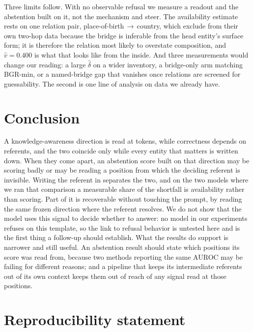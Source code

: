 \documentclass{article}
\begin{document}
Three limits follow. With no observable refusal we measure a readout and the abstention built on it,
not the mechanism \citet{ferrando2025entity} and \citet{lindsey2025biology} steer. The availability
estimate rests on one relation pair, place-of-birth\,$\to$\,country, which \citet{yang2024shortcuts}
exclude from their own two-hop data because the bridge is inferable from the head entity's surface
form; it is therefore the relation most likely to overstate composition, and $\hat v=0.400$ is what
that looks like from the inside. And three measurements would change our reading: a large
$\hat\delta$ on a wider inventory, a bridge-only arm matching BGR-min, or a named-bridge gap that
vanishes once relations are screened for guessability. The second is one line of analysis on data we
already have.

\section{Conclusion}

A knowledge-awareness direction is read at tokens, while correctness depends on referents, and the two
coincide only while every entity that matters is written down. When they come apart, an abstention
score built on that direction may be scoring badly or may be reading a position from which the
deciding referent is invisible. Writing the referent in separates the two, and on the two models where
we ran that comparison a measurable share of the shortfall is availability rather than scoring. Part
of it is recoverable without touching the prompt, by reading the same frozen direction where the
referent resolves. We do not show that the model uses this signal to decide whether to answer: no
model in our experiments refuses on this template, so the link to refusal behavior is untested here
and is the first thing a follow-up should establish. What the results do support is narrower and still
useful. An abstention result should state which positions its score was read from, because two methods
reporting the same AUROC may be failing for different reasons; and a pipeline that keeps its
intermediate referents out of its own context keeps them out of reach of any signal read at those
positions.

\section*{Reproducibility statement}
\end{document}
